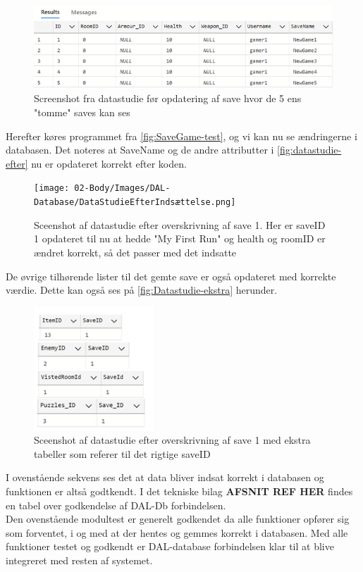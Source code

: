 \begin{figure}[H]
\centering
\includegraphics[width = \textwidth]{02-Body/Images/DAL-Database/DatastudieFørIndsættelse.png}
\caption{Screenshot fra datastudie før opdatering af save hvor de 5 ens "tomme" saves kan ses}
\label{fig:datastudie-før}
\end{figure}

Herefter køres programmet fra \autoref{fig:SaveGame-test}, og vi kan nu se ændringerne i databasen.
Det noteres at SaveName og de andre attributter i \autoref{fig:datastudie-efter} nu er opdateret korrekt efter koden.

\begin{figure}[H]
\centering
\texttt{[image: 02-Body/Images/DAL-Database/DataStudieEfterIndsættelse.png]}
\caption{Sceenshot af datastudie efter overskrivning af save 1. Her er saveID 1 opdateret til nu at hedde "My First Run" og health og roomID er ændret korrekt, så det passer med det indsatte}
\label{fig:datastudie-efter}
\end{figure}

\noindent De øvrige tilhørende lister til det gemte save er også opdateret med korrekte værdie. Dette kan også ses på \autoref{fig:Datastudie-ekstra} herunder.

\begin{figure}[H]
\centering
\includegraphics[width = 0.4\textwidth]{02-Body/Images/DAL-Database/Lister.png}
\caption{Sceenshot af datastudie efter overskrivning af save 1 med ekstra tabeller som referer til det rigtige saveID}
\label{fig:Datastudie-ekstra}
\end{figure}

I ovenstående sekvens ses det at data bliver indsat korrekt i databasen og funktionen er altså godtkendt.
I det tekniske bilag \textbf{AFSNIT REF HER} findes en tabel over godkendelse af DAL-Db forbindelsen.\\

Den ovenstående modultest er generelt godkendet da alle funktioner opfører sig som forventet, i og med at der hentes og gemmes korrekt i databasen. Med alle funktioner testet og godkendt er DAL-database forbindelsen klar til at blive integreret med resten af systemet.
